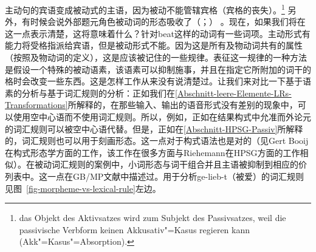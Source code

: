 \ex 主动句的宾语变成被动式的主语，因为被动不能管辖宾格（宾格的丧失）。\footnote{%
das Objekt des Aktivsatzes wird zum Subjekt des Passivsatzes, weil die passivische Verbform
keinen Akkusativ"=Kasus regieren kann (Akk"=Kasus"=Absorption).}\citep[]{Lohnstein2014a} 
\zl
另外，有时候会说外部题元角色被动词的形态吸收了（\citealp{Jaeggli86a}；\citealp[]{Haegeman94a-u}） 。现在，如果我们将在这一点表示清楚，这将意味着什么？针对beat这样的动词有一些词项。主动形式有能力将受格指派给宾语，但是被动形式不能。因为这是所有及物动词共有的属性（按照及物动词的定义），这是应该被记住的一些规律。表征这一规律的一种方法是假设一个特殊的被动语素，该语素可以抑制施事，并且在指定它所附加的词干的格时会改变一些东西。这是怎样工作从来没有说清楚过。让我们来对比一下基于语素的分析与基于词汇规则的分析：正如我们在\ref{Abschnitt-leere-Elemente-LRs-Transformations}所解释的，在那些输入、输出的语音形式没有差别的现象中，可以使用空中心语而不使用词汇规则。所以，例如，正如在结果构式中允准而外论元的词汇规则可以被空中心语代替。但是，正如在\ref{Abschnitt-HPSG-Passiv}所解释的，词汇规则也可以用于刻画形态。这一点对于构式语法\indexcxgc 也是对的（见Gert Booij在构式形态学方面的工作\citeyearpar{Booij2010a}，该工作在很多方面与Riehemann在HPSG方面的工作相似\citeyearpar{Riehemann93a,Riehemann98a}）。在被动词汇规则的案例中，小词形态与词干组合并且主语被抑制到相应的价列表中。这一点在GB/MP文献中描述过。用于分析ge-lieb-t（被爱）的词汇规则见图~\vref{fig-morpheme-vs-lexical-rule}左边。
